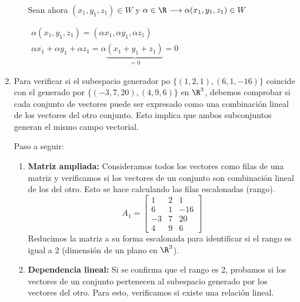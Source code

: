 \begin{enumerate}[label=\color{red}\textbf{\arabic*)}]
\begin{enumerate}[label=\color{red}\textbf{\alph*)}]
                Sean ahora $(x_1,y_1,z_1)\in W$ y $\alpha\in \R\longrightarrow \alpha(x_1,y_1,z_1)\in W$

                $\begin{array}{l}
                    \alpha(x_1,y_1,z_1)=(\alpha x_1,\alpha y_1,\alpha z_1)\\
                    \alpha x_1+\alpha y_1+\alpha z_1=\alpha\underbrace{(x_1+y_1+z_1)}_{=0}=0
                \end{array}$
        \end{enumerate}
    \item {} 

        Para verificar si el subespacio generador po $\{(1,2,1),(6,1,-16)\} $ coincide con el generado por $\{(-3,7,20),(4,9,6)\} $ en $\R^3$, debemos comprobar si cada conjunto de vectores puede ser expresado como una combinación lineal de los vectores del otro conjunto. Esto implica que ambos subconjuntos generan el mismo campo vectorial.

        Paso a seguir:
        \begin{enumerate}[label=\arabic*)]
            \item \textbf{Matriz ampliada:} Consideramos todos los vectores como filas de una matriz y verificamos si los vectores de un conjunto son combinación lineal de los del otro. Esto se hace calculando las filas escalonadas (rango). \[
            A_1=\begin{bmatrix} 
                1 & 2 & 1\\
                6 & 1 & -16\\
                -3 & 7 & 20\\
                4 & 9 & 6
            \end{bmatrix} 
            \]  
            Reducimos la matriz a su forma escalonada para identificar si el rango es igual a 2 (dimensión de un plano en $\R^3$).
        \item \textbf{Dependencia lineal:} Si se confirma que el rango es 2, probamos si los vectores de un conjunto pertenecen al subespacio generado por los vectores del otro. Para esto, verificamos si existe una relación lineal. 


\end{enumerate}
\end{enumerate}
